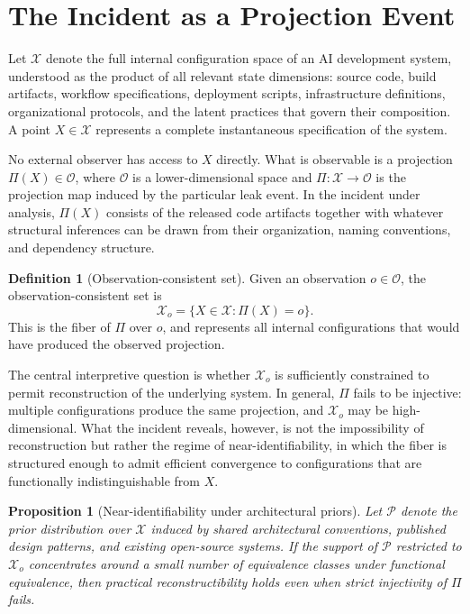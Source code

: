 \documentclass[12pt, oneside]{article}
\theoremstyle{plain}
\newtheorem{proposition}[theorem]{Proposition}
\theoremstyle{definition}
\newtheorem{definition}[theorem]{Definition}
\theoremstyle{remark}
\newcommand{\proj}{\Pi}
\newcommand{\config}{\mathcal{X}}
\newcommand{\obs}{\mathcal{O}}
\newcommand{\prior}{\mathcal{P}}
\begin{document}
\section{The Incident as a Projection Event}

Let $\config$ denote the full internal configuration space of an AI development system,
understood as the product of all relevant state dimensions: source code, build artifacts,
workflow specifications, deployment scripts, infrastructure definitions, organizational
protocols, and the latent practices that govern their composition. A point $X \in \config$
represents a complete instantaneous specification of the system.

No external observer has access to $X$ directly. What is observable is a projection
$\proj(X) \in \obs$, where $\obs$ is a lower-dimensional space and $\proj : \config \to \obs$
is the projection map induced by the particular leak event. In the incident under analysis,
$\proj(X)$ consists of the released code artifacts together with whatever structural
inferences can be drawn from their organization, naming conventions, and dependency structure.

\begin{definition}[Observation-consistent set]
Given an observation $o \in \obs$, the observation-consistent set is
\[
  \config_o = \{ X \in \config : \proj(X) = o \}.
\]
This is the fiber of $\proj$ over $o$, and represents all internal configurations that would
have produced the observed projection.
\end{definition}

The central interpretive question is whether $\config_o$ is sufficiently constrained to
permit reconstruction of the underlying system. In general, $\proj$ fails to be injective:
multiple configurations produce the same projection, and $\config_o$ may be high-dimensional.
What the incident reveals, however, is not the impossibility of reconstruction but rather
the regime of near-identifiability, in which the fiber is structured enough to admit
efficient convergence to configurations that are functionally indistinguishable from $X$.

\begin{proposition}[Near-identifiability under architectural priors]
Let $\prior$ denote the prior distribution over $\config$ induced by shared architectural
conventions, published design patterns, and existing open-source systems. If the support of
$\prior$ restricted to $\config_o$ concentrates around a small number of equivalence classes
under functional equivalence, then practical reconstructibility holds even when strict
injectivity of $\proj$ fails.
\end{proposition}
\end{document}
